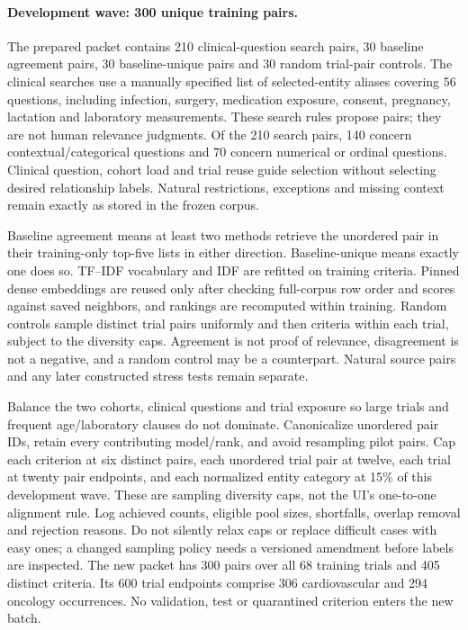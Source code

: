 \documentclass[10pt,letterpaper]{article}
\begin{document}
\paragraph{Development wave: 300 unique training pairs.}
The prepared packet contains 210 clinical-question search pairs, 30 baseline
agreement pairs, 30 baseline-unique pairs and 30 random trial-pair controls.
The clinical searches use a manually specified list of selected-entity aliases
covering 56 questions, including infection, surgery, medication exposure,
consent, pregnancy, lactation and laboratory measurements. These search rules
propose pairs; they are not human relevance judgments. Of the 210 search pairs,
140 concern contextual/categorical questions and 70 concern numerical or
ordinal questions. Clinical question, cohort load and trial reuse guide
selection without selecting desired relationship labels. Natural restrictions,
exceptions and missing context remain exactly as stored in the frozen corpus.

Baseline agreement means at least two methods retrieve the unordered pair in
their training-only top-five lists in either direction. Baseline-unique means
exactly one does so. TF--IDF vocabulary and IDF are refitted on training criteria.
Pinned dense embeddings are reused only after checking full-corpus row order
and scores against saved neighbors, and rankings are recomputed within training.
Random controls sample distinct trial pairs uniformly and then criteria within
each trial, subject to the diversity caps. Agreement is not proof of relevance,
disagreement is not a negative, and a random control may be a counterpart.
Natural source pairs and any later constructed stress tests remain separate.

Balance the two cohorts, clinical questions and trial exposure so large trials
and frequent age/laboratory clauses do not dominate.
Canonicalize unordered pair IDs, retain every contributing model/rank, and avoid
resampling pilot pairs. Cap each criterion at six distinct pairs, each unordered
trial pair at twelve, each trial at twenty pair endpoints, and each normalized
entity category at 15\% of this development wave. These are sampling diversity
caps, not the UI's one-to-one alignment rule. Log achieved counts, eligible pool
sizes, shortfalls, overlap removal and rejection reasons. Do not silently relax
caps or replace difficult cases with easy ones; a changed sampling policy needs
a versioned amendment before labels are inspected. The new packet has 300
pairs over all 68 training trials and 405 distinct criteria. Its 600 trial
endpoints comprise 306 cardiovascular and 294 oncology occurrences. No
validation, test or quarantined criterion enters the new batch.
\end{document}
